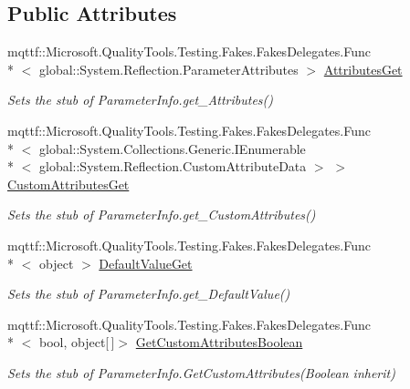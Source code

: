 \subsection*{Public Attributes}
\begin{DoxyCompactItemize}
\item 
mqttf\-::\-Microsoft.\-Quality\-Tools.\-Testing.\-Fakes.\-Fakes\-Delegates.\-Func\\*
$<$ global\-::\-System.\-Reflection.\-Parameter\-Attributes $>$ \hyperlink{class_system_1_1_reflection_1_1_fakes_1_1_stub_parameter_info_a8f199567d4a65bcb8d5e7b97c8e1c1fe}{Attributes\-Get}
\begin{DoxyCompactList}\small\item\em Sets the stub of Parameter\-Info.\-get\-\_\-\-Attributes()\end{DoxyCompactList}\item 
mqttf\-::\-Microsoft.\-Quality\-Tools.\-Testing.\-Fakes.\-Fakes\-Delegates.\-Func\\*
$<$ global\-::\-System.\-Collections.\-Generic.\-I\-Enumerable\\*
$<$ global\-::\-System.\-Reflection.\-Custom\-Attribute\-Data $>$ $>$ \hyperlink{class_system_1_1_reflection_1_1_fakes_1_1_stub_parameter_info_ab2a6595070f16566d72ce775a734ba91}{Custom\-Attributes\-Get}
\begin{DoxyCompactList}\small\item\em Sets the stub of Parameter\-Info.\-get\-\_\-\-Custom\-Attributes()\end{DoxyCompactList}\item 
mqttf\-::\-Microsoft.\-Quality\-Tools.\-Testing.\-Fakes.\-Fakes\-Delegates.\-Func\\*
$<$ object $>$ \hyperlink{class_system_1_1_reflection_1_1_fakes_1_1_stub_parameter_info_abcc7475ffac6117e3dfef0226d5837c4}{Default\-Value\-Get}
\begin{DoxyCompactList}\small\item\em Sets the stub of Parameter\-Info.\-get\-\_\-\-Default\-Value()\end{DoxyCompactList}\item 
mqttf\-::\-Microsoft.\-Quality\-Tools.\-Testing.\-Fakes.\-Fakes\-Delegates.\-Func\\*
$<$ bool, object\mbox{[}$\,$\mbox{]}$>$ \hyperlink{class_system_1_1_reflection_1_1_fakes_1_1_stub_parameter_info_ac251b549e7b0d0234e7e0e2ab872f2c9}{Get\-Custom\-Attributes\-Boolean}
\begin{DoxyCompactList}\small\item\em Sets the stub of Parameter\-Info.\-Get\-Custom\-Attributes(\-Boolean inherit)\end{DoxyCompactList}\item 

\end{DoxyCompactItemize}
